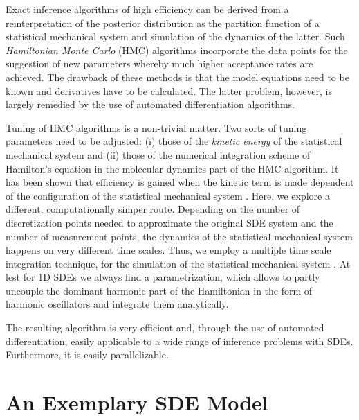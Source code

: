 \documentclass[12pt,a4paper,final]{iopart}
\begin{document}
Exact inference algorithms of high efficiency can be derived from a reinterpretation of the posterior distribution as the partition function of a statistical mechanical system and simulation of the dynamics of the latter.
Such {\em Hamiltonian Monte Carlo} (HMC) algorithms \cite{duane_1987_HMC} incorporate the data points for the suggestion of new parameters whereby much higher acceptance rates are achieved.
The drawback of these methods is that the model equations need to be known and derivatives have to be calculated. The latter problem, however, is largely remedied by the use of automated differentiation algorithms.

Tuning of HMC algorithms is a non-trivial matter.
Two sorts of tuning parameters need to be adjusted: (i) those of the {\em kinetic energy} of the statistical mechanical system and (ii) those of the numerical integration scheme of Hamilton's equation in the molecular dynamics part of the HMC algorithm.
It has been shown that efficiency is gained when the kinetic term is made dependent of the configuration of the statistical mechanical system \cite{girolami_2011_HMC}.
Here, we explore a different, computationally simper route.
Depending on the number of discretization points needed to approximate the original SDE system and the number of measurement points, the dynamics of the statistical mechanical system happens on very different time scales.
Thus, we employ a multiple time scale integration technique, for the simulation of the statistical mechanical system \cite{tuckerman1993efficient}.
At lest for 1D SDEs we always find a parametrization, which allows to partly uncouple the dominant harmonic part of the Hamiltonian in the form of harmonic oscillators and integrate them analytically.

The resulting algorithm is very efficient and, through the use of automated differentiation, easily applicable to a wide range of inference problems with SDEs.
Furthermore, it is easily parallelizable.

\section{An Exemplary SDE Model}
\end{document}
